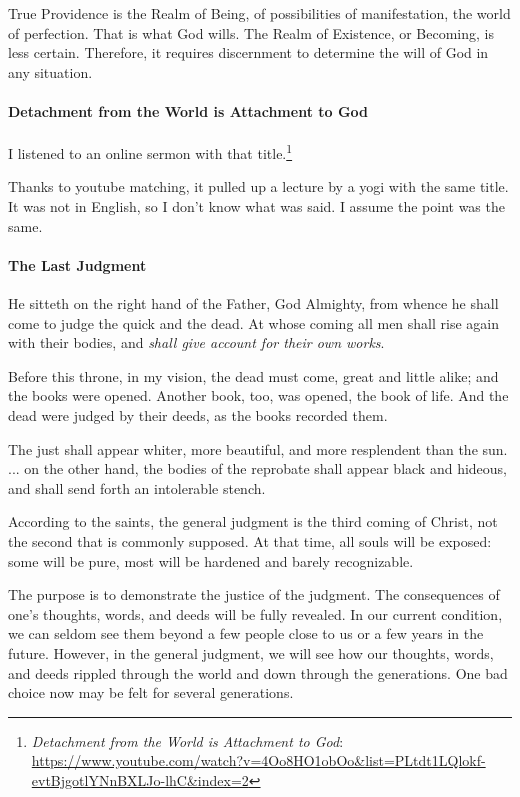 True Providence is the Realm of Being, of possibilities of manifestation, the world of perfection. That is what God wills. The Realm of Existence, or Becoming, is less certain. Therefore, it requires discernment to determine the will of God in any situation.

\paragraph{Detachment from the World is Attachment to God}


I listened to an online sermon with that title.\footnote{\textit{Detachment from the World is Attachment to God}: \url{https://www.youtube.com/watch?v=4Oo8HO1obOo\&list=PLtdt1LQlokf-evtBjgotlYNnBXLJo-lhC\&index=2}}

Thanks to youtube matching, it pulled up a lecture by a yogi with the same title. It was not in English, so I don't know what was said. I assume the point was the same.

\paragraph{The Last Judgment}


\begin{quotex}
He sitteth on the right hand of the Father, God Almighty, from whence he shall come to judge the quick and the dead. At whose coming all men shall rise again with their bodies, and \emph{shall give account for their own works}.

Before this throne, in my vision, the dead must come, great and little alike; and the books were opened. Another book, too, was opened, the book of life. And the dead were judged by their deeds, as the books recorded them.

The just shall appear whiter, more beautiful, and more resplendent than the sun. ... on the other hand, the bodies of the reprobate shall appear black and hideous, and shall send forth an intolerable stench.
\end{quotex}


According to the saints, the general judgment is the third coming of Christ, not the second that is commonly supposed. At that time, all souls will be exposed: some will be pure, most will be hardened and barely recognizable.

The purpose is to demonstrate the justice of the judgment. The consequences of one's thoughts, words, and deeds will be fully revealed. In our current condition, we can seldom see them beyond a few people close to us or a few years in the future. However, in the general judgment, we will see how our thoughts, words, and deeds rippled through the world and down through the generations. One bad choice now may be felt for several generations.

